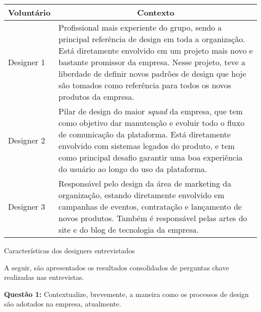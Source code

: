 \begin{quadro}
\centering
\begin{tabular}{|m{4cm}|m{10cm}|} \hline
	
	\multicolumn{1}{|c|}{\bfseries Voluntário} & \multicolumn{1}{c|}{\bfseries Contexto} \\\hline
	
	 Designer 1 & Profissional mais experiente do grupo, sendo a principal referência de design em toda a organização. Está diretamente envolvido em um projeto mais novo e bastante promissor da empresa. Nesse projeto, teve a liberdade de definir novos padrões de design que hoje são tomados como referência para todos os novos produtos da empresa. \\\hline
	 
	 Designer 2 & Pilar de design do maior \textit{squad} da empresa, que tem como objetivo dar manutenção e evoluir todo o fluxo de comunicação da plataforma. Está diretamente envolvido com sistemas legados do produto, e tem como principal desafio garantir uma boa experiência do usuário ao longo do uso da plataforma. \\\hline
	 
	 Designer 3 &  Responsável pelo design da área de marketing da organização, estando diretamente envolvido em campanhas de eventos, contratação e lançamento de novos produtos. Também é responsável pelas artes do site e do blog de tecnologia da empresa. \\\hline
    
\end{tabular}
\caption{Características dos designers entrevistados}
\label{table:designersResearch}
\end{quadro}

A seguir, são apresentados os resultados consolidados de perguntas chave realizadas nas entrevistas.

\textbf{Questão 1:} Contextualize, brevemente, a maneira como os processos de design são adotados na empresa, atualmente.

